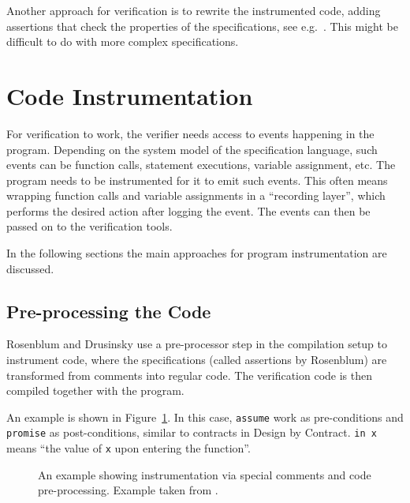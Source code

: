 \documentclass[a4paper,11pt]{kth-mag}
\theoremstyle{definition}
\begin{document}
Another approach for verification is to rewrite the instrumented code, adding
assertions that check the properties of the specifications, see e.g.\
\cite{rosenblum95practicalassertions, drusinsky00temporalrover}. This might be
difficult to do with more complex specifications.


\section{Code Instrumentation} \label{section-instrumentation}

For verification to work, the verifier needs access to events happening in the
program. Depending on the system model of the specification language, such
events can be function calls, statement executions, variable assignment, etc.
The program needs to be instrumented for it to emit such events. This often
means wrapping function calls and variable assignments in a ``recording
layer'', which performs the desired action after logging the event. The events
can then be passed on to the verification tools.

In the following sections the main approaches for program instrumentation are
discussed.


\subsection{Pre-processing the Code}

Rosenblum \cite{rosenblum95practicalassertions} and Drusinsky
\cite{drusinsky00temporalrover} use a pre-processor step in the compilation
setup to instrument code, where the specifications (called assertions by
Rosenblum) are transformed from comments into regular code. The verification
code is then compiled together with the program.

An example is shown in Figure~\ref{figure-pre-processing-comments-example}. In
this case, \texttt{assume} work as pre-conditions and \texttt{promise} as
post-conditions, similar to contracts in Design by Contract. \texttt{in x}
means ``the value of \texttt{x} upon entering the function''.

\begin{figure}[h!]
	\begin{center}
	\begin{minipage}{0.7\textwidth}
    \lstset{language=C}
		
	\end{minipage}
	\end{center}
  \caption{An example showing instrumentation via special comments and code
    pre-processing. Example taken from \cite{rosenblum95practicalassertions}.}
	\label{figure-pre-processing-comments-example}
\end{figure}
\end{document}
